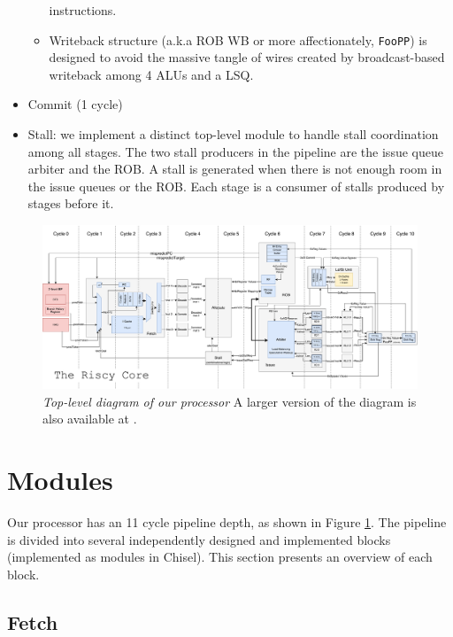 \documentclass{article}
\begin{document}
\begin{itemize}
\begin{itemize}
                instructions.
            \item Writeback structure (a.k.a ROB WB or more affectionately,
                \texttt{FooPP}) is designed to avoid the massive tangle of wires
                created by broadcast-based writeback among 4 ALUs and a LSQ.
        \end{itemize}
    \item Commit (1 cycle)
    \item Stall: we implement a distinct top-level module to handle stall
        coordination among all stages. The two stall producers in the pipeline
        are the issue queue arbiter and the ROB. A stall is generated when there
        is not enough room in the issue queues or the ROB. Each stage is a
        consumer of stalls produced by stages before it.
\end{itemize}

\begin{figure}[ht]
	\includegraphics[page=1,width=\textwidth]{riscy_diagram.pdf}
    \caption{\textit{Top-level diagram of our processor} A larger version of
    the diagram is also available at \cite{riscy-diagram}.}
	\label{fig:top-level}
\end{figure}

\section{Modules}
\label{sec:modules}

Our processor has an 11 cycle pipeline depth, as shown in Figure
\ref{fig:top-level}. The pipeline is divided into several independently
designed and implemented blocks (implemented as modules in Chisel). This
section presents an overview of each block.

\subsection{Fetch}
\end{document}
